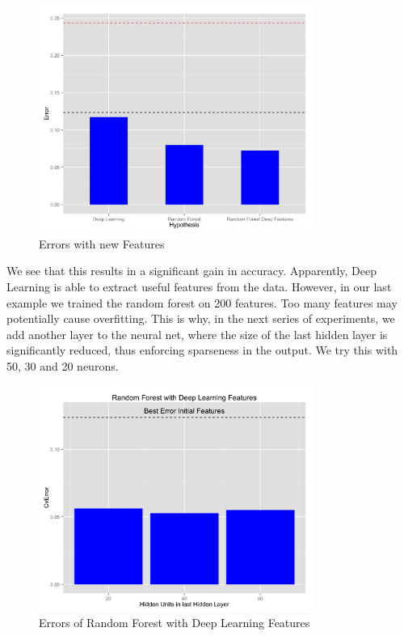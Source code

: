 \documentclass[paper=a4, fontsize=11pt]{scrartcl}
\numberwithin{equation}{section}
\numberwithin{figure}{section}
\numberwithin{table}{section}
\begin{document}
\begin{figure}[H]
    \centering
    \includegraphics[width=0.8\textwidth]{barchart_new_features_errors.png}
    \caption{Errors with new Features}
    \label{fig:errors}
\end{figure}

We see that this results in a significant gain in accuracy. Apparently, Deep Learning is able to extract useful features from the data. However, in our last example we trained the random forest on 200 features. Too many features may potentially cause overfitting. This is why, in the next series of experiments, we add another layer to the neural net, where the size of the last hidden layer is significantly reduced, thus enforcing sparseness in the output. We try this with 50, 30 and 20 neurons. 

\begin{figure}[H]
    \centering
    \includegraphics[width=0.8\textwidth]{barchart_error_neurons.png}
    \caption{ Errors of Random Forest with Deep Learning Features }
    \label{fig:errors}
\end{figure}
\end{document}
